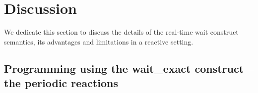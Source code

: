 \section{Discussion}
\label{sec:disc-perc-limit}

We dedicate this section to discuss the details of the real-time wait
construct semantics, its advantages and limitations in a reactive
setting.

\subsection{Programming using the wait\_exact construct -- the
  periodic reactions}
\label{sec:progr-using-delay}







